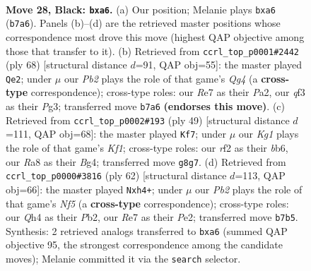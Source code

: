 \documentclass[11pt]{article}
\begin{document}
\clearpage

\begin{figure}[p]\centering
\begin{subfigure}{0.46\textwidth}\centering
\resizebox{\linewidth}{!}{%
\newchessgame
\chessboard[
  setfen={r5k1/pp2r3/R3p1p1/7P/7q/1N3Q2/1P3RB1/2B3K1 b - - 0 28},
  showmover=false,
  pgfstyle=straightmove, color=movearrow, markmove={b7-a6}
]}
\caption{}
\end{subfigure}\hfill
\begin{subfigure}{0.46\textwidth}\centering
\resizebox{\linewidth}{!}{%
\newchessgame
\chessboard[
  setfen={5k2/1B3p2/5q2/p4r2/2Pb2Q1/6Pp/PP3P2/5RK1 w - - 3 35},
  showmover=false,
  pgfstyle=straightmove, color=movearrow, markmove={g4-e2}
]}
\caption{}
\end{subfigure}
\\[4pt]
\begin{subfigure}{0.46\textwidth}\centering
\resizebox{\linewidth}{!}{%
\newchessgame
\chessboard[
  setfen={2r2k1r/6p1/pBq2p2/4R2p/4P1b1/8/PPP2Q1P/2K2R2 b - - 0 25},
  showmover=false,
  pgfstyle=straightmove, color=movearrow, markmove={f8-f7}
]}
\caption{}
\end{subfigure}\hfill
\begin{subfigure}{0.46\textwidth}\centering
\resizebox{\linewidth}{!}{%
\newchessgame
\chessboard[
  setfen={4bk2/2p4p/8/5Nr1/p6q/4rR1P/PP2P3/2R4K w - - 0 32},
  showmover=false,
  pgfstyle=straightmove, color=movearrow, markmove={f5-h4}
]}
\caption{}
\end{subfigure}
\caption{\textbf{Move 28, Black: \texttt{bxa6}.} (a) Our position; Melanie plays \texttt{bxa6} (\texttt{b7a6}). Panels (b)--(d) are the retrieved master positions whose correspondence most drove this move (highest QAP objective among those that transfer to it). (b) Retrieved from \texttt{ccrl\_top\_p0001\#2442} (ply 68) [structural distance $d$=91, QAP obj=55]: the master played \texttt{Qe2}; under $\mu$ our \emph{Pb2} plays the role of that game's \emph{Qg4} (a \textbf{cross-type} correspondence); cross-type roles: our \emph{R}e7 as their \emph{P}a2, our \emph{q}f3 as their \emph{P}g3; transferred move \texttt{b7a6} \textbf{(endorses this move)}. (c) Retrieved from \texttt{ccrl\_top\_p0002\#193} (ply 49) [structural distance $d$=111, QAP obj=68]: the master played \texttt{Kf7}; under $\mu$ our \emph{Kg1} plays the role of that game's \emph{Kf1}; cross-type roles: our \emph{r}f2 as their \emph{b}b6, our \emph{R}a8 as their \emph{B}g4; transferred move \texttt{g8g7}. (d) Retrieved from \texttt{ccrl\_top\_p0000\#3816} (ply 62) [structural distance $d$=113, QAP obj=66]: the master played \texttt{Nxh4+}; under $\mu$ our \emph{Pb2} plays the role of that game's \emph{Nf5} (a \textbf{cross-type} correspondence); cross-type roles: our \emph{Q}h4 as their \emph{P}b2, our \emph{R}e7 as their \emph{P}e2; transferred move \texttt{b7b5}. Synthesis: 2 retrieved analogs transferred to \texttt{bxa6} (summed QAP objective 95, the strongest correspondence among the candidate moves); Melanie committed it via the \texttt{search} selector.}
\label{fig:thought-m55}
\end{figure}
\end{document}
